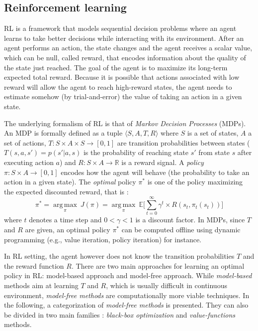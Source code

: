 \subsection{Reinforcement learning}

RL is a framework that models sequential decision
problems where an agent learns to take better decisions while interacting with
its environment. After an agent performs an action, the state changes and the
agent receives a scalar value, which can be null, called reward, that encodes information
about the quality of the state just reached. The goal of the agent is to maximize
its long-term expected total reward. Because it is possible that actions associated 
with low reward will allow the agent to reach high-reward states, the agent
needs to estimate somehow (by trial-and-error) the value of taking an action in
a given state.

The underlying formalism of RL is that of {\em Markov Decision Processes} (MDPs).
An MDP is formally defined as a tuple $\langle S, A, T, R \rangle$ where $S$ is a set of states, $A$ a set of actions, $T : S \times A \times S \rightarrow [0, 1]$ 
are transition probabilities between states
($T(s,a,s')=p(s'|a,s)$ is the probability of reaching state $s'$ from state $s$ after executing action $a$) and 
$R : S \times A \rightarrow \mathbb{R}$ is a reward signal. A \textit{policy} $\pi : S \times A \rightarrow [0, 1]$ encodes how the agent will behave (the probability
to take an action in a given state).
The {\em optimal} policy $\pi^*$ is one of the policy maximizing the expected discounted reward, that is :
\begin{equation}
\pi^* = \underset{\pi}{\operatorname{arg\,max}}\ J(\pi) = \underset{\pi}{\operatorname{arg\,max}}\ \mathbb{E} \Big[ \sum\limits_{t=0}^{\infty} \gamma^t \times R(s_t, \pi_t(s_t)) \Big]
\end{equation}
where $t$ denotes a time step and $0 < \gamma < 1$ is a discount factor.
In MDPs, since $T$ and $R$ are given, an optimal policy $\pi^*$ can be computed offline using dynamic programming (e.g., value iteration, policy                                                                  
iteration) \cite{Howard1960} for instance.

In RL setting, the agent however does not know the transition probabilities $T$ and the reward function $R$.
There are two main approaches for learning an optimal policy in RL: model-based approach and model-free approach.
While {\em model-based} methods aim at learning $T$ and $R$, which is usually difficult in continuous environment,
{\em model-free methods} are computationally more viable techniques.
In the following, a categorization of {\em model-free methods} is presented.
They can also be divided in two main families : {\em black-box optimization} \cite{Jones1998} and {\em value-functions} methods.

